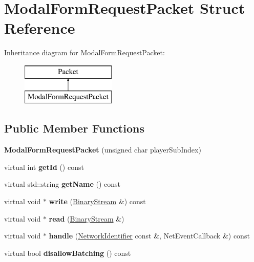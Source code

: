 \hypertarget{struct_modal_form_request_packet}{}\section{Modal\+Form\+Request\+Packet Struct Reference}
\label{struct_modal_form_request_packet}
Inheritance diagram for Modal\+Form\+Request\+Packet\+:\begin{figure}[H]
\begin{center}
\leavevmode
\includegraphics[height=2.000000cm]{struct_modal_form_request_packet}
\end{center}
\end{figure}
\subsection*{Public Member Functions}
\begin{DoxyCompactItemize}
\item 
\mbox{\label{struct_modal_form_request_packet_add091ff2e2a22fb025f4f652b38ab60a}} 
{\bfseries Modal\+Form\+Request\+Packet} (unsigned char player\+Sub\+Index)
\item 
\mbox{\label{struct_modal_form_request_packet_a3ebf07486ce15d760d939fdc31e6a52a}} 
virtual int {\bfseries get\+Id} () const
\item 
\mbox{\label{struct_modal_form_request_packet_a065c043651477df0e6311723a42ac78e}} 
virtual std\+::string {\bfseries get\+Name} () const
\item 
\mbox{\label{struct_modal_form_request_packet_ab17eb6ed2a94b9bf51b8366ae3ffc309}} 
virtual void $\ast$ {\bfseries write} (\mbox{\hyperlink{struct_binary_stream}{Binary\+Stream}} \&) const
\item 
\mbox{\label{struct_modal_form_request_packet_a8d27cb9dc3662babcae9cb69c74b767f}} 
virtual void $\ast$ {\bfseries read} (\mbox{\hyperlink{struct_binary_stream}{Binary\+Stream}} \&)
\item 
\mbox{\label{struct_modal_form_request_packet_a8edcb3437835c6a590642e95e7a36a7a}} 
virtual void $\ast$ {\bfseries handle} (\mbox{\hyperlink{struct_network_identifier}{Network\+Identifier}} const \&, Net\+Event\+Callback \&) const
\item 
\mbox{\label{struct_modal_form_request_packet_a00fedc2527ae5d28a0e3c59e8ef581b4}} 
virtual bool {\bfseries disallow\+Batching} () const
\end{DoxyCompactItemize}
